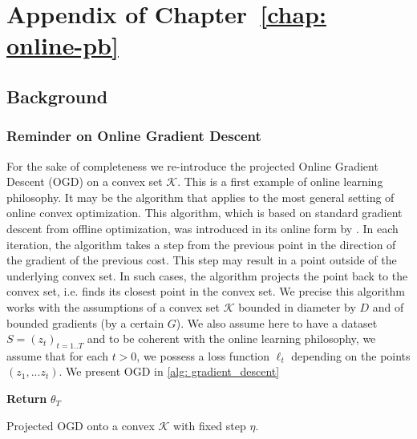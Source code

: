 \chapter{Appendix of Chapter~\ref{chap: online-pb}}
\label{ap: online-pb}

\minitoc

\begin{noaddcontents}

\section{Background}

\subsection{Reminder on Online Gradient Descent }
\label{sec: OGD_reminder}

For the sake of completeness we re-introduce the projected Online Gradient Descent (OGD) on a convex set $\mathcal{K}$. This is a first example of online learning philosophy. It may be the algorithm that applies to the most general setting
of online convex optimization. This algorithm,
which is based on standard gradient descent from offline optimization, was
introduced in its online form by \cite{zinkevich2003online}.
In each iteration, the algorithm takes a step from the previous point in
the direction of the gradient of the previous cost. This step may result in
a point outside of the underlying convex set. In such cases, the algorithm
projects the point back to the convex set, i.e. finds its closest point in the
convex set. We precise this algorithm works with the assumptions of a convex set $\mathcal{K}$ bounded in diameter by $D$ and of bounded gradients (by a certain $G$).
We also assume here to have a dataset $S=(z_t)_{t=1..T}$ and to be coherent with the online learning philosophy, we assume that for each $t>0$, we possess a loss function $\ell_t$ depending on the points $(z_1,...z_t)$. We present OGD in \cref{alg: gradient_descent}


\begin{algorithm}[ht]
 \SetAlgoLined
\textbf{Return} $\theta_{T}$
 \caption{Projected OGD onto a convex $\mathcal{K}$ with fixed step $\eta$.}
 \label{alg: gradient_descent}
 \end{algorithm}


\end{noaddcontents}
